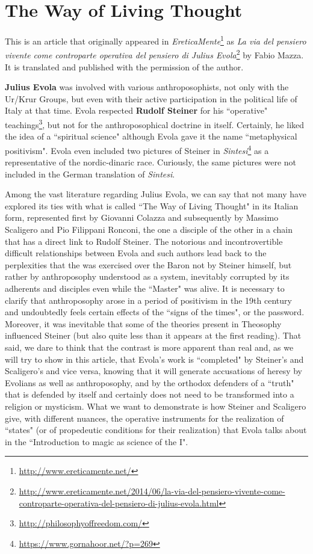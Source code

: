 \section{The Way of Living Thought}

\begin{quotex}
This is an article that originally appeared in \textit{EreticaMente}\footnote{\url{http://www.ereticamente.net/}} as \textit{La via del pensiero vivente come controparte operativa del pensiero di Julius Evola}\footnote{\url{http://www.ereticamente.net/2014/06/la-via-del-pensiero-vivente-come-controparte-operativa-del-pensiero-di-julius-evola.html}} by Fabio Mazza. It is translated and published with the permission of the author.

\textbf{Julius Evola} was involved with various anthroposophists, not only with the Ur/Krur Groups, but even with their active participation in the political life of Italy at that time. Evola respected \textbf{Rudolf Steiner} for his ``operative" teachings\footnote{\url{http://philosophyoffreedom.com/}}, but not for the anthroposophical doctrine in itself. Certainly, he liked the idea of a ``spiritual science" although Evola gave it the name ``metaphysical positivism". Evola even included two pictures of Steiner in \textit{Sintesi}\footnote{\url{https://www.gornahoor.net/?p=269}} as a representative of the nordic-dinaric race. Curiously, the same pictures were not included in the German translation of \textit{Sintesi}.

\end{quotex}
Among the vast literature regarding Julius Evola, we can say that not many have explored its ties with what is called ``The Way of Living Thought" in its Italian form, represented first by Giovanni Colazza and subsequently by Massimo Scaligero and Pio Filippani Ronconi, the one a disciple of the other in a chain that has a direct link to Rudolf Steiner. The notorious and incontrovertible difficult relationships between Evola and such authors lead back to the perplexities that the was exercised over the Baron not by Steiner himself, but rather by anthroposophy understood as a system, inevitably corrupted by its adherents and disciples even while the ``Master" was alive. It is necessary to clarify that anthroposophy arose in a period of positivism in the 19th century and undoubtedly feels certain effects of the ``signs of the times", or the password. Moreover, it was inevitable that some of the theories present in Theosophy influenced Steiner (but also quite less than it appears at the first reading). That said, we dare to think that the contrast is more apparent than real and, as we will try to show in this article, that Evola's work is ``completed" by Steiner's and Scaligero's and vice versa, knowing that it will generate accusations of heresy by Evolians as well as anthroposophy, and by the orthodox defenders of a ``truth" that is defended by itself and certainly does not need to be transformed into a religion or mysticism. What we want to demonstrate is how Steiner and Scaligero give, with different nuances, the operative instruments for the realization of ``states" (or of propedeutic conditions for their realization) that Evola talks about in the ``Introduction to magic as science of the I".

